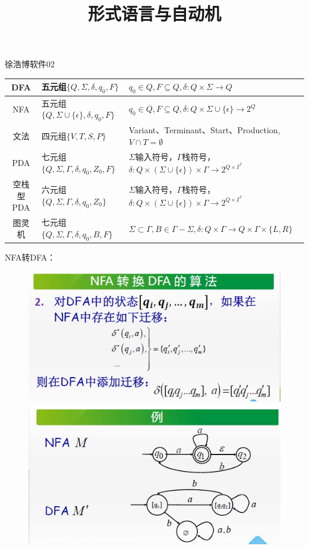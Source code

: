 \documentclass[UTF8]{ctexart}
\begin{document}
\renewcommand{\thefootnote}{\fnsymbol{footnote}}
\linespread{1.4}
\title{\vspace{-5em}\heiti 形式语言与自动机\vspace{-2.5em}}
\date{}
\maketitle
\begin{center}
{\fangsong 徐浩博\quad 软件02}
\end{center}\begin{center}
\begin{tabular}{c|l|l}
    \hline
    DFA&五元组$\{Q,\Sigma,\delta,q_0,F\}$&$q_0\in Q, F\subseteq Q,\delta:Q\times \Sigma\to Q$\\
    \hline
    NFA&五元组$\{Q,\Sigma\cup\{\epsilon\},\delta,q_0,F\}$&$q_0\in Q, F\subseteq Q,\delta:Q\times \Sigma\cup\{\epsilon\}\to 2^Q$\\
    \hline
    文法&四元组$\{V,T,S,P\}$&Variant、Terminant、Start、Production,$V\cap T=\emptyset$\\
    \hline
    PDA&七元组$\{Q,\Sigma,\Gamma,\delta,q_0,Z_0,F\}$&$\Sigma$输入符号，$\Gamma$栈符号，$\delta:Q\times (\Sigma\cup \{\epsilon\})\times \Gamma \to 2^{Q\times \Gamma^*}$\\
    \hline
    空栈型PDA&六元组$\{Q,\Sigma,\Gamma,\delta,q_0,Z_0\}$&$\Sigma$输入符号，$\Gamma$栈符号，$\delta:Q\times (\Sigma\cup \{\epsilon\})\times \Gamma \to 2^{Q\times \Gamma^*}$\\
    \hline
    图灵机&七元组$\{Q,\Sigma,\Gamma,\delta,q_0,B,F\}$&$\Sigma\subset \Gamma, B\in \Gamma-\Sigma,\delta:Q\times \Gamma \to Q\times \Gamma \times \{L,R\}$
\end{tabular}\end{center}
\newpage
NFA转DFA：\\
\begin{figure}[htbp]
\includegraphics*[scale = 1]{NFAtoDFA.PNG}
\includegraphics*[scale = 1]{NFAtoDFA2.PNG}
\end{figure}
\end{document}
